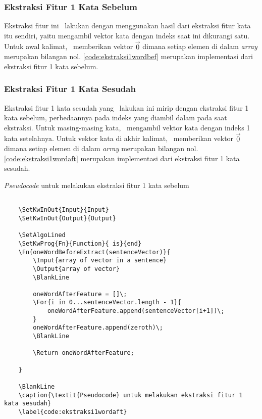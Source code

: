 \subsubsection{Ekstraksi Fitur 1 Kata Sebelum}
Ekstraksi fitur ini \saya~lakukan dengan menggunakan hasil dari ekstraksi fitur kata itu sendiri, yaitu mengambil vektor kata dengan indeks saat ini dikurangi satu. Untuk awal kalimat, \saya~memberikan vektor $ \vec{0} $ dimana setiap elemen di dalam \textit{array} merupakan bilangan nol. \ref{code:ekstraksi1wordbef} merupakan implementasi dari ekstraksi fitur 1 kata sebelum.

\subsubsection{Ekstraksi Fitur 1 Kata Sesudah}
Ekstraksi fitur 1 kata sesudah yang \saya~lakukan ini mirip dengan ekstraksi fitur 1 kata sebelum, perbedaannya pada indeks yang diambil dalam pada saat ekstraksi. Untuk masing-masing kata, \saya~mengambil vektor kata dengan indeks 1 kata setelahnya. Untuk vektor kata di akhir kalimat, \saya~memberikan vektor $ \vec{0} $ dimana setiap elemen di dalam \textit{array} merupakan bilangan nol. \ref{code:ekstraksi1wordaft} merupakan implementasi dari ekstraksi fitur 1 kata sesudah.

\begin{kode}	
	
	\SetAlgoLined

	\BlankLine
	
	\caption{\textit{Pseudocode} untuk melakukan ekstraksi fitur 1 kata sebelum}
	\label{code:ekstraksi1wordbef}	
\end{kode}

\begin{lstlisting}
	
	\SetKwInOut{Input}{Input}
	\SetKwInOut{Output}{Output}
	
	\SetAlgoLined
	\SetKwProg{Fn}{Function}{ is}{end}
	\Fn{oneWordBeforeExtract(sentenceVector)}{
		\Input{array of vector in a sentence}
		\Output{array of vector}
		\BlankLine
		
		oneWordAfterFeature = []\;
		\For{i in 0...sentenceVector.length - 1}{
			oneWordAfterFeature.append(sentenceVector[i+1])\;
		}
		oneWordAfterFeature.append(zeroth)\;
		\BlankLine
		
		\Return oneWordAfterFeature;
		
	}
	
	\BlankLine	
	\caption{\textit{Pseudocode} untuk melakukan ekstraksi fitur 1 kata sesudah}
	\label{code:ekstraksi1wordaft}
\end{lstlisting}

